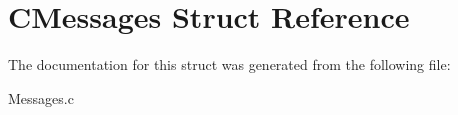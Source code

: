 \hypertarget{struct_c_messages}{}\section{C\+Messages Struct Reference}
\label{struct_c_messages}


The documentation for this struct was generated from the following file\+:\begin{DoxyCompactItemize}
\item 
Messages.\+c\end{DoxyCompactItemize}
